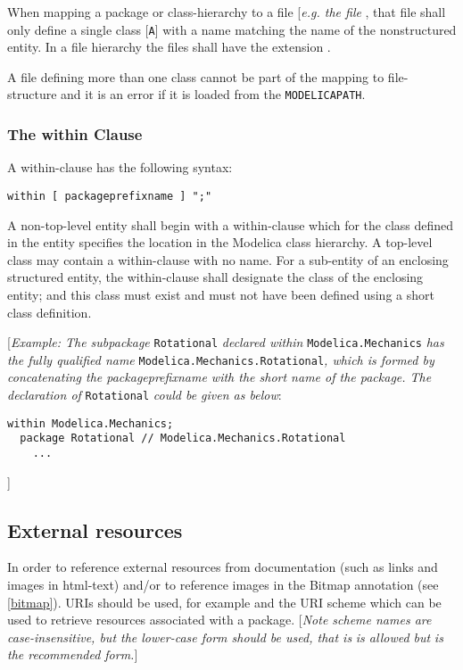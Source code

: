 When mapping a package or class-hierarchy to a file {[}\emph{e.g. the
  file} \filename{A.mo}{]}, that file shall only define a single class {[}\lstinline!A!{]} with a
name matching the name of the nonstructured entity. In a file hierarchy
the files shall have the extension .

A  file defining more than one class cannot be part of the mapping
to file-structure and it is an error if it is loaded from the
\lstinline!MODELICAPATH!.

\subsubsection{The within Clause}

A within-clause has the following syntax:

\begin{lstlisting}[language=grammar]
  within [ packageprefixname ] ";"
\end{lstlisting}
  A non-top-level entity shall begin with a within-clause which for the
  class defined in the entity specifies the location in the Modelica class
    hierarchy. A top-level class may contain a within-clause with no name.
    For a sub-entity of an enclosing structured entity, the within-clause
shall designate the class of the enclosing entity; and this class must
exist and must not have been defined using a short class definition.

{[}\emph{Example: The subpackage} \lstinline!Rotational! \emph{declared within}
\lstinline!Modelica.Mechanics! \emph{has the fully qualified name}
\lstinline!Modelica.Mechanics.Rotational!\emph{, which is formed by concatenating
the packageprefixname with the short name of the package. The
declaration of} \lstinline!Rotational! \emph{could be given as below}:

\begin{lstlisting}[language=modelica]
  within Modelica.Mechanics;
  package Rotational // Modelica.Mechanics.Rotational
    ...
\end{lstlisting}
{]}

\subsection{External resources}

In order to reference external resources from documentation (such as
links and images in html-text) and/or to reference images in the Bitmap
annotation (see \autoref{bitmap}). URIs should be used, for example
 and the URI scheme  which can be used to retrieve
resources associated with a package. {[}\emph{Note scheme names are
case-insensitive, but the lower-case form should be used, that is}  \emph{is allowed but}  \emph{is the
recommended form.}{]}


